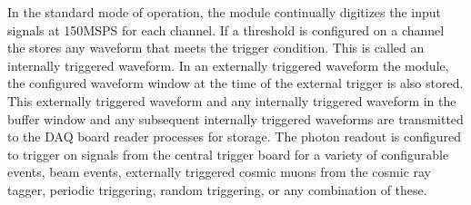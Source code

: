 

In the standard mode of operation, the module continually digitizes the input signals at \num{150}{MSPS} for each channel.  If a threshold is configured on a channel the  stores any waveform that meets the trigger condition.  This is called an internally triggered waveform. In an externally triggered waveform the module, the configured waveform window at the time of the external trigger is also stored.  This externally triggered waveform and any internally triggered waveform in the buffer window and any subsequent internally triggered waveforms are transmitted to the DAQ board reader processes for storage. The photon readout is configured to trigger on signals from the central trigger board for a variety of configurable events, beam events, externally triggered cosmic muons from the cosmic ray tagger, periodic triggering, random triggering, or any combination of these.

